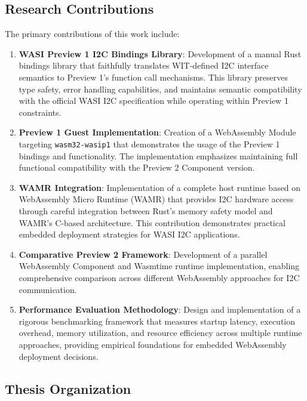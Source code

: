 \subsection{Research Contributions}
\label{subsec:research-contributions}

The primary contributions of this work include:

\begin{enumerate}
    \item \textbf{WASI Preview 1 I2C Bindings Library}: Development of a manual Rust bindings library that faithfully translates WIT-defined I2C interface semantics to Preview 1's function call mechanisms. This library preserves type safety, error handling capabilities, and maintains semantic compatibility with the official WASI I2C specification while operating within Preview 1 constraints.

    \item \textbf{Preview 1 Guest Implementation}: Creation of a WebAssembly Module targeting \sloppy\texttt{wasm32-wasip1} that demonstrates the usage of the Preview 1 bindings and functionality. The implementation emphasizes maintaining full functional compatibility with the Preview 2 Component version.
    
    \item \textbf{WAMR Integration}: Implementation of a complete host runtime based on WebAssembly Micro Runtime (WAMR) that provides I2C hardware access through careful integration between Rust's memory safety model and WAMR's C-based architecture. This contribution demonstrates practical embedded deployment strategies for WASI I2C applications.
    
    \item \textbf{Comparative Preview 2 Framework}: Development of a parallel WebAssembly Component and Wasmtime runtime implementation, enabling comprehensive comparison across different WebAssembly approaches for I2C communication.
    
    \item \textbf{Performance Evaluation Methodology}: Design and implementation of a rigorous benchmarking framework that measures startup latency, execution overhead, memory utilization, and resource efficiency across multiple runtime approaches, providing empirical foundations for embedded WebAssembly deployment decisions.
\end{enumerate}

\subsection{Thesis Organization}
\label{subsec:thesis-organization}

